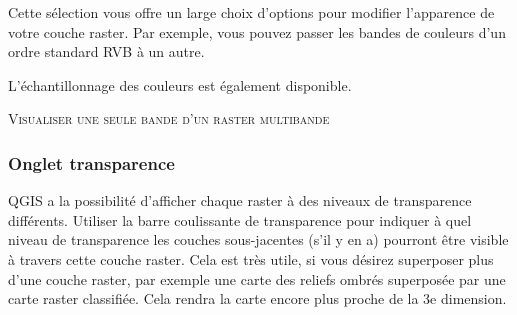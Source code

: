 
Cette sélection vous offre un large choix d'options pour modifier l'apparence
de votre couche raster. Par exemple, vous pouvez passer les bandes de couleurs
d'un ordre standard RVB à un autre.

L'échantillonnage des couleurs est également disponible.

\begin{Astuce}\caption{\textsc{Visualiser une seule bande d'un raster multibande}}
\end{Astuce} 

\subsubsection{Onglet transparence} \label{rastertab:transparency}

QGIS a la possibilité d'afficher chaque raster à des niveaux de transparence
différents. Utiliser la barre coulissante de
transparence pour indiquer à quel niveau de transparence les couches sous-jacentes
(s'il y en a) pourront être visible à travers cette couche raster. Cela est
très utile, si vous désirez superposer plus d'une couche raster, par exemple
une carte des reliefs ombrés superposée par une carte raster classifiée. Cela
rendra la carte encore plus proche de la 3e dimension.

